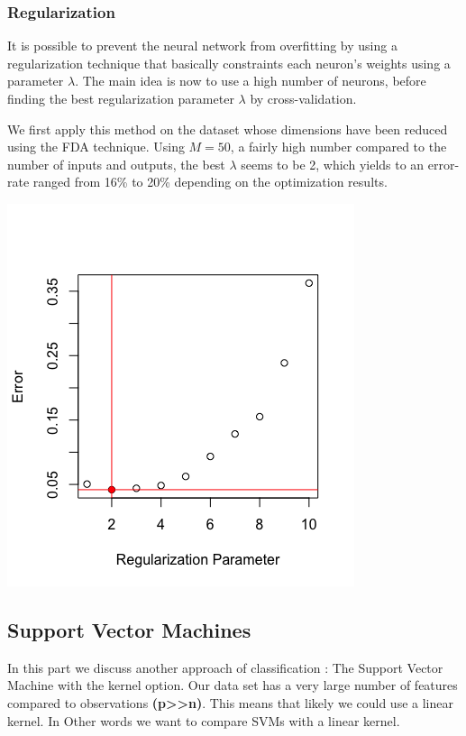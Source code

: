 \documentclass[]{report}
\begin{document}
\subsubsection{Regularization}
 It is possible to prevent the neural network from overfitting by using a regularization technique that basically constraints each neuron's weights using a parameter $\lambda$. The main idea is now to use a high number of neurons, before finding the best regularization parameter  $\lambda$ by cross-validation.
 
 We first apply this method on the dataset whose dimensions have been reduced using the FDA technique. Using $M = 50$, a fairly high number compared to the number of inputs and outputs, the best $\lambda$ seems to be 2, which yields to an error-rate ranged from 16\% to 20\% depending on the optimization results.
 
 \begin{center}
 	\includegraphics[width=0.6\linewidth]{Figures/nnet_fda_reg_cv.png}
 	\label{fig:nnet_fda_reg_cv}
 \end{center}


 
\pagebreak
\subsection{Support Vector Machines}
In this part we discuss another approach of classification : The Support Vector Machine with the kernel option. Our data set has a very large number of features compared to observations \textbf{(p>>n)}. This means that likely we could use a linear kernel. In Other words we want to compare SVMs with a linear kernel.
\end{document}
